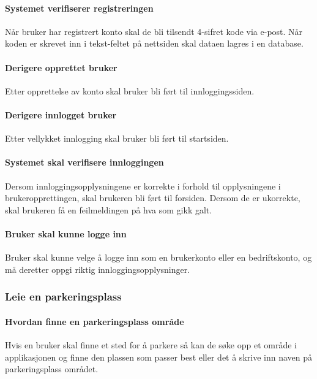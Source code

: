 \documentclass[12pt]{article}
\begin{document}
            \paragraph{Systemet verifiserer registreringen}
            Når bruker har registrert konto skal de bli tilsendt 4-sifret kode via e-post. Når koden er skrevet inn i tekst-feltet på nettsiden skal dataen lagres i en database.

            \paragraph{Derigere opprettet bruker}
            Etter opprettelse av konto skal bruker bli ført til innloggingssiden.

            \paragraph{Derigere innlogget bruker}
            Etter vellykket innlogging skal bruker bli ført til startsiden.

            \paragraph{Systemet skal verifisere innloggingen}
            Dersom innloggingsopplysningene er korrekte i forhold til opplysningene i brukeropprettingen, skal brukeren bli ført til forsiden. Dersom de er ukorrekte, skal brukeren få en feilmeldingen på hva som gikk galt.

            \paragraph{Bruker skal kunne logge inn}
            Bruker skal kunne velge å logge inn som en brukerkonto eller en bedriftskonto, og må deretter oppgi riktig innloggingsopplysninger.
        
        \subsubsection{Leie en parkeringsplass}

            \paragraph{Hvordan finne en parkeringsplass område}
            Hvis en bruker skal finne et sted for å parkere så kan de søke opp et område i applikasjonen og finne den plassen som passer best eller det å skrive inn naven på parkeringsplass området.
\end{document}
